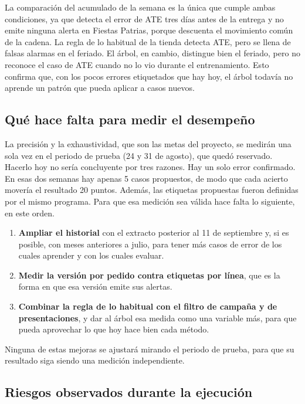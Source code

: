 La comparación del acumulado de la semana es la única que cumple ambas condiciones, ya que detecta el error de ATE tres días antes de la entrega y no emite ninguna alerta en Fiestas Patrias, porque descuenta el movimiento común de la cadena. La regla de lo habitual de la tienda detecta ATE, pero se llena de falsas alarmas en el feriado. El árbol, en cambio, distingue bien el feriado, pero no reconoce el caso de ATE cuando no lo vio durante el entrenamiento. Esto confirma que, con los pocos errores etiquetados que hay hoy, el árbol todavía no aprende un patrón que pueda aplicar a casos nuevos.

\subsection{Qué hace falta para medir el desempeño}
\label{sec:av-mejoras}

La precisión y la exhaustividad, que son las metas del proyecto, se medirán una sola vez en el periodo de prueba (24 y 31 de agosto), que quedó reservado. Hacerlo hoy no sería concluyente por tres razones. Hay un solo error confirmado. En esas dos semanas hay apenas 5 casos propuestos, de modo que cada acierto movería el resultado 20 puntos. Además, las etiquetas propuestas fueron definidas por el mismo programa. Para que esa medición sea válida hace falta lo siguiente, en este orden.

\begin{enumerate}
\item \textbf{Ampliar el historial} con el extracto posterior al 11 de septiembre y, si es posible, con meses anteriores a julio, para tener más casos de error de los cuales aprender y con los cuales evaluar.
\item \textbf{Medir la versión por pedido contra etiquetas por línea}, que es la forma en que esa versión emite sus alertas.
\item \textbf{Combinar la regla de lo habitual con el filtro de campaña y de presentaciones}, y dar al árbol esa medida como una variable más, para que pueda aprovechar lo que hoy hace bien cada método.
\end{enumerate}

Ninguna de estas mejoras se ajustará mirando el periodo de prueba, para que su resultado siga siendo una medición independiente.

\iffinal\else
\subsection{Riesgos observados durante la ejecución}
\label{sec:av-riesgos}

